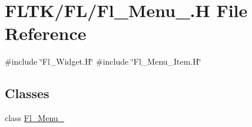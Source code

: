 \hypertarget{_fl___menu___8_h}{}\section{F\+L\+T\+K/\+F\+L/\+Fl\+\_\+\+Menu\+\_\+.H File Reference}
\label{_fl___menu___8_h}
{\ttfamily \#include \char`\"{}Fl\+\_\+\+Widget.\+H\char`\"{}}\newline
{\ttfamily \#include \char`\"{}Fl\+\_\+\+Menu\+\_\+\+Item.\+H\char`\"{}}\newline
\subsection*{Classes}
\begin{DoxyCompactItemize}
\item 
class \hyperlink{class_fl___menu__}{Fl\+\_\+\+Menu\+\_\+}
\end{DoxyCompactItemize}

